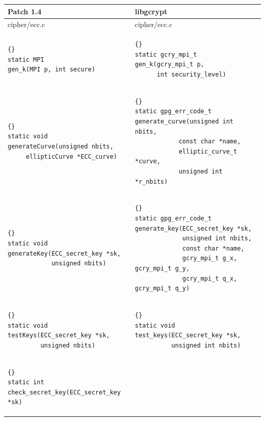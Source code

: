 \documentclass[12pt,twoside,catalan,a4paper]{book}%
\numberwithin{figure}{section}		%
\theoremstyle{definition}   			%
\theoremstyle{saltolinea}   			%
\begin{document}
\begin{table}
\begin{center}
\begin{sideways}
\begin{tabular}{|l|l|}
\hline
Patch 1.4 & libgcrypt \\
\hline
 {\sf cipher/ecc.c}     & {\sf cipher/ecc.c} \\
\hline
 {\tt \begin{lstlisting}{}
static MPI
gen_k(MPI p, int secure)
      \end{lstlisting} }
 &
 {\tt \begin{lstlisting}{}
static gcry_mpi_t
gen_k(gcry_mpi_t p,
      int security_level)
      \end{lstlisting} }
 \\
\hline
 {\tt \begin{lstlisting}{}
static void
generateCurve(unsigned nbits,
     ellipticCurve *ECC_curve)
      \end{lstlisting} }
 &
 {\tt \begin{lstlisting}{}
static gpg_err_code_t
generate_curve(unsigned int nbits,
            const char *name,
            elliptic_curve_t *curve,
            unsigned int *r_nbits)
      \end{lstlisting} }
 \\
\hline
 {\tt \begin{lstlisting}{}
static void
generateKey(ECC_secret_key *sk, 
            unsigned nbits)
      \end{lstlisting} }
 &
 {\tt \begin{lstlisting}{}
static gpg_err_code_t
generate_key(ECC_secret_key *sk,
             unsigned int nbits,
             const char *name,
             gcry_mpi_t g_x, gcry_mpi_t g_y,
             gcry_mpi_t q_x, gcry_mpi_t q_y)
      \end{lstlisting} }
 \\
\hline
 {\tt \begin{lstlisting}{}
static void
testKeys(ECC_secret_key *sk,
         unsigned nbits)
      \end{lstlisting} }
 &
 {\tt \begin{lstlisting}{}
static void
test_keys(ECC_secret_key *sk,
          unsigned int nbits)
      \end{lstlisting} }
 \\
\hline
 {\tt \begin{lstlisting}{}
static int
check_secret_key(ECC_secret_key *sk)
      \end{lstlisting} }

\end{tabular}
\end{sideways}
\end{center}
\end{table}
\end{document}
